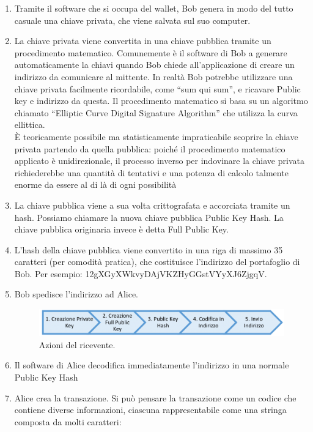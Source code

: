 \begin{enumerate}\itemsep2pt
\item Tramite il software che si occupa del wallet, Bob genera in modo del tutto casuale una chiave privata, che viene salvata sul suo computer.
\item La chiave privata viene convertita in una chiave pubblica tramite un procedimento matematico. Comunemente è il software di Bob a generare automaticamente la chiavi quando Bob chiede all'applicazione di creare un indirizzo da comunicare al mittente. In realtà Bob potrebbe utilizzare una chiave privata facilmente ricordabile, come “sum qui sum”, e ricavare Public key e indirizzo da questa. Il procedimento matematico si basa su un algoritmo chiamato “Elliptic Curve Digital Signature Algorithm”\cite{bitcoin:ECDSA} che utilizza la curva ellittica.
\\È teoricamente possibile ma statisticamente impraticabile scoprire la chiave privata partendo da quella pubblica: poiché il procedimento matematico applicato è unidirezionale, il processo inverso per indovinare la chiave privata richiederebbe una quantità di tentativi e una potenza di calcolo talmente enorme da essere al di là di ogni possibilità
\item La chiave pubblica viene a sua volta crittografata e accorciata tramite un hash. Possiamo chiamare la nuova chiave pubblica Public Key Hash. La chiave pubblica originaria invece è detta Full Public Key.
\item L'hash della chiave pubblica viene convertito in una riga di massimo 35 caratteri (per comodità pratica), che costituisce l'indirizzo del portafoglio di Bob. Per esempio: 12gXGyXWkvyDAjVKZHyGGstVYyXJ6ZjgqV.
\item Bob spedisce l'indirizzo ad Alice.
\begin{figure}[H]
	\centering
	\includegraphics[width=\textwidth]{images/passiDiBob.png}
	\caption{Azioni del ricevente.}
	\label{fig:bobSteps}
\end{figure}
\item Il software di Alice decodifica immediatamente l'indirizzo in una normale Public Key Hash
\item \label{aliceCreaTransazione} Alice crea la transazione. Si può pensare la transazione come un codice che contiene diverse informazioni, ciascuna rappresentabile come una stringa composta da molti caratteri:

\end{enumerate}
